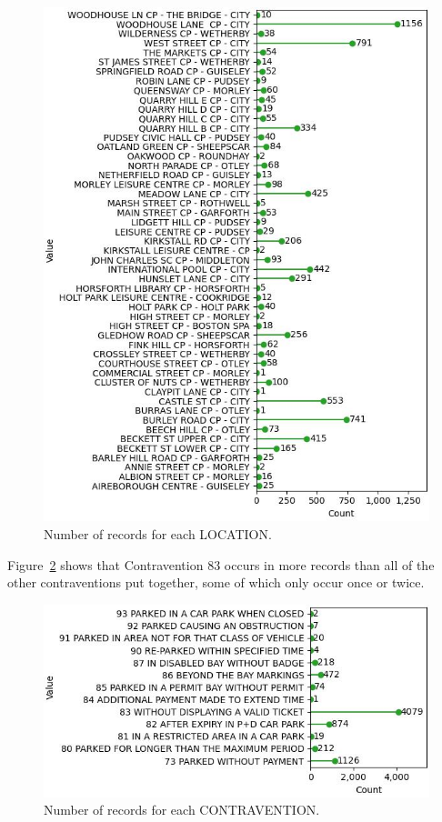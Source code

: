 \documentclass{article}
\begin{document}
\begin{figure}[h!]
  \includegraphics[width=\linewidth]{value_counts LOCATION.jpg}
  \caption{Number of records for each LOCATION.}
  \label{fig:3}
\end{figure}

Figure~\ref{fig:4} shows that Contravention 83 occurs in more records than all of the other contraventions put together, some of which only occur once or twice.

\begin{figure}[h!]
  \includegraphics[width=\linewidth]{value_counts CONTRAVENTION.jpg}
  \caption{Number of records for each CONTRAVENTION.}
  \label{fig:4}
\end{figure}
\end{document}
